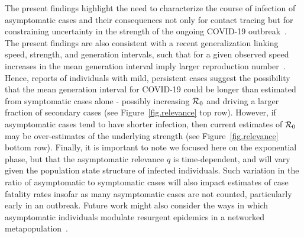 The present findings highlight the need to characterize
the course of infection of asymptomatic cases and their consequences
not only for contact tracing but for constraining
uncertainty in the strength of the ongoing COVID-19 outbreak~\citep{park_preprint}.
The present findings are also consistent with
a recent generalization linking speed, strength, and
generation intervals, such that
for a given observed speed
increases in the mean generation interval imply
larger reproduction number~\citep{park_2019practical}. Hence, reports of individuals
with mild, persistent cases 
suggest the possibility that the mean generation interval for COVID-19
could be longer than estimated from symptomatic cases alone - possibly
increasing ${\cal{R}}_0$ and driving a larger fraction of secondary cases
(see Figure~\ref{fig.relevance} top row).
However, if asymptomatic cases tend to have shorter infection, then
current estimates of ${\cal{R}}_0$ may be over-estimates of the
underlying strength (see Figure~\ref{fig.relevance} bottom row).
Finally, it is important to note we focused here on the exponential
phase, but that the asymptomatic relevance $q$ is time-dependent, and will
vary given the population state structure of infected individuals.  Such
variation in the ratio of asymptomatic to symptomatic cases
will also impact estimates of case fatality rates insofar
as many asymptomatic cases are not counted, particularly early in an outbreak.
Future work might also consider the ways in which asymptomatic individuals
modulate resurgent epidemics in a networked metapopulation~\citep{watts_pnas2005}.

